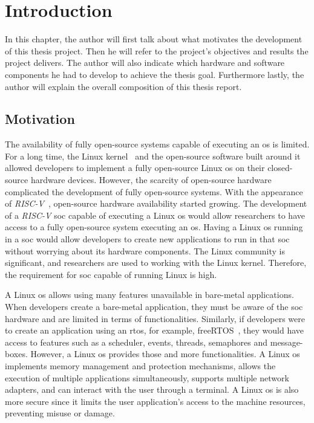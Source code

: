 \chapter{Introduction}
\label{chapter:introduction}
In this chapter, the author will first talk about what motivates the development of this thesis project. Then he will refer to the project's objectives and results the project delivers. The author will also indicate which hardware and software components he had to develop to achieve the thesis goal. Furthermore lastly, the author will explain the overall composition of this thesis report.

\section{Motivation}
\label{section:motivation}
The availability of fully open-source systems capable of executing an \acrfull{os} is limited. For a long time, the Linux kernel~\cite{torvalds1997linux} and the open-source software built around it allowed developers to implement a fully open-source Linux \acrshort{os} on their closed-source hardware devices. However, the scarcity of open-source hardware complicated the development of fully open-source systems. With the appearance of \textit{RISC-V}~\cite{asanovic2014instruction}, open-source hardware availability started growing. The development of a \textit{RISC-V} \acrfull{soc} capable of executing a Linux \acrshort{os} would allow researchers to have access to a fully open-source system executing an \acrshort{os}. Having a Linux \acrshort{os} running in a \acrshort{soc} would allow developers to create new applications to run in that \acrshort{soc} without worrying about its hardware components. The Linux community is significant, and researchers are used to working with the Linux kernel. Therefore, the requirement for \acrshort{soc} capable of running Linux is high.

A Linux \acrshort{os} allows using many features unavailable in bare-metal applications. When developers create a bare-metal application, they must be aware of the \acrshort{soc} hardware and are limited in terms of functionalities. Similarly, if developers were to create an application using an \acrfull{rtos}, for example, freeRTOS~\cite{barry2008freertos}, they would have access to features such as a scheduler, events, threads, semaphores and message-boxes. However, a Linux \acrshort{os} provides those and more functionalities. A Linux \acrshort{os} implements memory management and protection mechanisms, allows the execution of multiple applications simultaneously, supports multiple network adapters, and can interact with the user through a terminal. A Linux \acrshort{os} is also more secure since it limits the user application's access to the machine resources, preventing misuse or damage.

